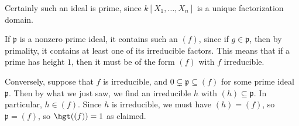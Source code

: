 Certainly such an ideal is prime, since $k[X_1, \ldots, X_n]$ is a unique factorization
domain.

If $\mathfrak{p}$ is a nonzero prime ideal, it contains such an $(f)$, since
if $g \in \mathfrak{p}$, then by primality, it contains at least one of its irreducible
factors. This means that if a prime has height $1$, then it must be of the form $(f)$
with $f$ irreducible.

Conversely, suppose that $f$ is irreducible, and
$0 \subsetneq \mathfrak{p} \subseteq (f)$ for some
prime ideal $\mathfrak{p}$. Then by what we just saw, we find an irreducible $h$
with $(h)\subseteq \mathfrak{p}$. In particular, $h \in (f)$. Since $h$ is irreducible,
we must have $(h) = (f)$, so $\mathfrak{p} = (f)$, so $\hgt((f)) = 1$ as claimed.
